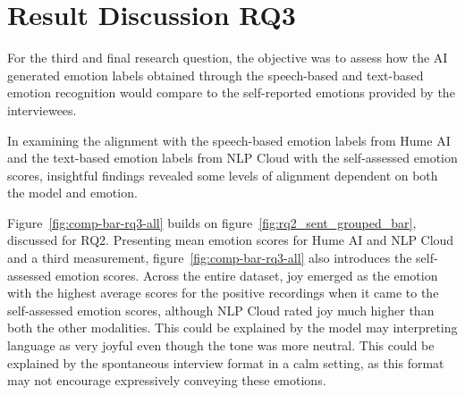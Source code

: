 
\section{Result Discussion RQ3}
For the third and final research question, the objective was to assess how the AI generated emotion labels obtained through the speech-based and text-based emotion recognition would compare to the self-reported emotions provided by the interviewees.

In examining the alignment with the speech-based emotion labels from Hume AI and the text-based emotion labels from NLP Cloud with the self-assessed emotion scores, insightful findings revealed some levels of alignment dependent on both the model and emotion.

Figure~\ref{fig:comp-bar-rq3-all} builds on figure~\ref{fig:rq2_sent_grouped_bar}, discussed for RQ2. Presenting mean emotion scores for Hume AI and NLP Cloud and a third measurement, figure~\ref{fig:comp-bar-rq3-all} also introduces the self-assessed emotion scores.
Across the entire dataset, joy emerged as the emotion with the highest average scores for the positive recordings when it came to the self-assessed emotion scores, although NLP Cloud rated joy much higher than both the other modalities. This could be explained by the model may interpreting language as very joyful even though the tone was more neutral. This could be explained by the spontaneous interview format in a calm setting, as this format may not encourage expressively conveying these emotions.


